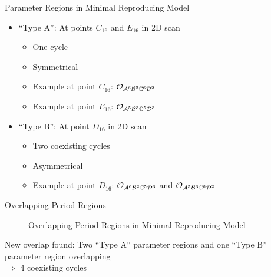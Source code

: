 \begin{frame}{Parameter Regions in Minimal Reproducing Model}
    \begin{itemize}
        \item ``Type A'': At points $C_{16}$ and $E_{16}$ in 2D scan
              \begin{itemize}
                  \item One cycle
                  \item Symmetrical
                  \item Example at point $C_{16}$: $\mathcal{O}_{\mathcal{A}^6\mathcal{B}^2\mathbb{C}^6\mathcal{D}^2}$
                  \item Example at point $E_{16}$: $\mathcal{O}_{\mathcal{A}^5\mathcal{B}^3\mathbb{C}^5\mathcal{D}^3}$ \vspace*{1em}
              \end{itemize}
        \item ``Type B'': At point $D_{16}$ in 2D scan
              \begin{itemize}
                  \item Two coexisting cycles
                  \item Asymmetrical
                  \item Example at point $D_{16}$: $\mathcal{O}_{\mathcal{A}^6\mathcal{B}^2\mathbb{C}^5\mathcal{D}^3}$ and $\mathcal{O}_{\mathcal{A}^5\mathcal{B}^3\mathbb{C}^6\mathcal{D}^2}$
              \end{itemize}
    \end{itemize}
\end{frame}

\begin{frame}{Overlapping Period Regions}
    \vspace{-1.0em}
    \begin{figure}
        \centering
        \caption{Overlapping Period Regions in Minimal Reproducing Model}
    \end{figure}
\end{frame}

\begin{frame}
    New overlap found:
    Two ``Type A'' parameter regions and one ``Type B'' parameter region overlapping \\
    $\Rightarrow$ 4 coexisting cycles


\end{frame}